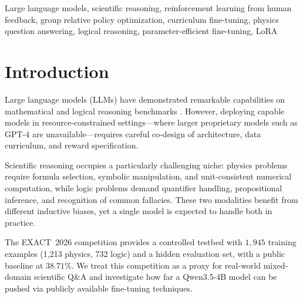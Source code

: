 \documentclass{ieeeaccess}
\newcommand{\basemodelname}{Qwen3.5-4B}
\newcommand{\dataset}{EXACT~2026}
\begin{document}
\begin{keywords}
Large language models, scientific reasoning, reinforcement learning
from human feedback, group relative policy optimization, curriculum
fine-tuning, physics question answering, logical reasoning,
parameter-efficient fine-tuning, LoRA
\end{keywords}

\titlepgskip=-21pt
\maketitle

\section{Introduction}
\label{sec:intro}

Large language models (LLMs) have demonstrated remarkable capabilities on
mathematical and logical reasoning benchmarks
\cite{Wei2022,Wang2023sc,Kojima2022}.
However, deploying capable models in resource-constrained settings—where
larger proprietary models such as GPT-4 are unavailable—requires careful
co-design of architecture, data curriculum, and reward specification.

Scientific reasoning occupies a particularly challenging niche:
physics problems require formula selection, symbolic manipulation, and
unit-consistent numerical computation, while logic problems demand
quantifier handling, propositional inference, and recognition of common
fallacies.
These two modalities benefit from different inductive biases, yet a
single model is expected to handle both in practice.

The \dataset{} competition provides a controlled testbed with $1{,}945$
training examples (1,213 physics, 732 logic) and a hidden evaluation set,
with a public baseline at $38.71\%$.
We treat this competition as a proxy for real-world mixed-domain scientific
Q\&A and investigate how far a \basemodelname{} model can be pushed via
publicly available fine-tuning techniques.
\end{document}
